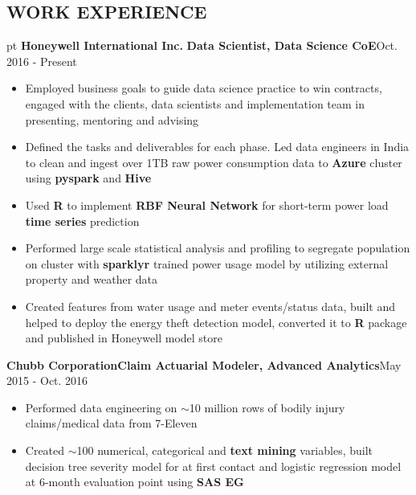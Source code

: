 \documentclass[10.5pt]{res} %
\begin{document}
\begin{resume}
\section{WORK EXPERIENCE}  pt
	\textbf{Honeywell International Inc.} \quad\quad\textbf{Data Scientist, Data Science CoE}\hfill Oct. 2016 - Present
		\begin{itemize}
			\item Employed business goals to guide data science practice to win contracts, engaged with the clients, data scientists and implementation team in presenting, mentoring and advising 
			\item Defined the tasks and deliverables for each phase. Led data engineers in India to clean and ingest over 1TB raw power consumption data to \textbf{Azure} cluster using \textbf{pyspark} and \textbf{Hive}
			\item Used \textbf{R} to implement \textbf{RBF Neural Network}  for short-term power load \textbf{time series} prediction     
			\item Performed large scale statistical analysis and profiling to segregate population on cluster with \textbf{sparklyr} trained power usage model by utilizing external property and weather data
			\item Created features from water usage and meter events/status data, built and helped to deploy the energy theft detection model, converted it to \textbf{R} package and published in Honeywell model store
		\end{itemize}\vspace{-\topsep}
	\textbf{Chubb Corporation}\quad \textbf{Claim Actuarial Modeler, Advanced Analytics}\hfill May 2015 - Oct. 2016
		\begin{itemize}  pt
			\item Performed data engineering on $\sim$10 million rows of bodily injury claims/medical data from 7-Eleven  
			\item Created $\sim$100 numerical, categorical and \textbf{text mining} variables, built {decision tree} severity model for at first contact and {logistic regression} model at 6-month evaluation point using \textbf{SAS EG} %

\end{itemize}
\end{resume}
\end{document}
